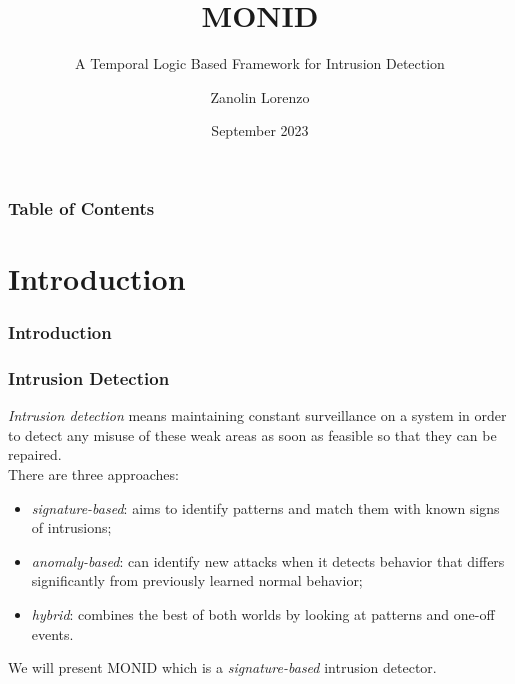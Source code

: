 \documentclass[aspectratio=169,t,xcolor=table]{beamer}
\begin{document}
\title[Inf UFG]{MONID}
\subtitle{A Temporal Logic Based Framework for Intrusion Detection}

\author{Zanolin Lorenzo}

\date{September 2023}
\frame[noframenumbering]{\titlepage}


\begin{frame}
    \frametitle{Table of Contents}
    \tableofcontents
\end{frame}

\section{Introduction}

\begin{frame}{}
    \frametitle{Introduction}
\end{frame}

\begin{frame}
    \frametitle{Intrusion Detection}
    \textit{Intrusion detection} means maintaining constant surveillance on a system in order to detect any misuse of these weak areas as soon as feasible so that they can be repaired.\\
    \vspace{5mm}
    There are three approaches:
    \begin{itemize}
        \item \textit{signature-based}: aims to identify patterns and match them with known signs of intrusions;
        \item \textit{anomaly-based}: can identify new attacks when it detects behavior that differs significantly from previously learned normal behavior;
        \item \textit{hybrid}: combines the best of both worlds by looking at patterns and one-off events.
    \end{itemize}
    \vspace{5mm}
    We will present MONID which is a \textit{signature-based} intrusion detector.
\end{frame}
\end{document}
